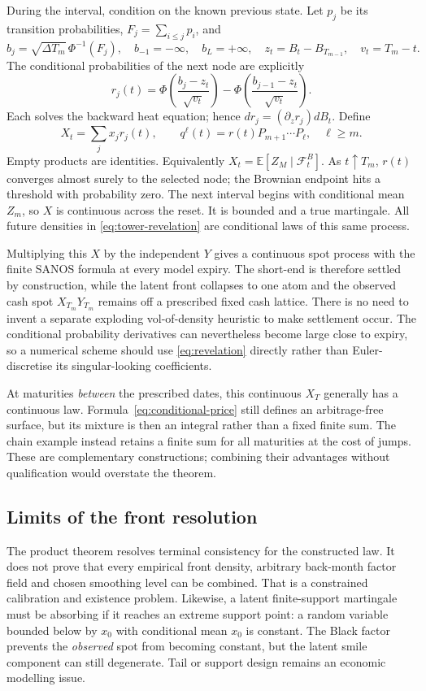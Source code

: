 \documentclass[11pt,a4paper]{article}
\numberwithin{equation}{section}
\theoremstyle{definition}\newtheorem{definition}[theorem]{Definition}
\theoremstyle{remark}\newtheorem{remark}[theorem]{Remark}
\newcommand{\E}{\mathbb E}\newcommand{\R}{\mathbb R}
\newcommand{\F}{\mathcal F}\newcommand{\G}{\mathcal G}
\begin{document}
During the interval, condition on the known previous state. Let $p_j$ be its transition probabilities, $F_j=\sum_{i\leq j}p_i$, and
\[
 b_j=\sqrt{\Delta T_m}\,\Phi^{-1}(F_j),\quad
 b_{-1}=-\infty,\quad b_L=+\infty,\quad
 z_t=B_t-B_{T_{m-1}},\quad v_t=T_m-t.
\]
The conditional probabilities of the next node are explicitly
\begin{equation}
 r_j(t)=\Phi\left(\frac{b_j-z_t}{\sqrt{v_t}}\right)
       -\Phi\left(\frac{b_{j-1}-z_t}{\sqrt{v_t}}\right).
 \label{eq:revelation}
\end{equation}
Each solves the backward heat equation; hence $dr_j=(\partial_z r_j)dB_t$. Define
\begin{equation}
 X_t=\sum_jx_jr_j(t),\qquad
 q^\ell(t)=r(t)P_{m+1}\cdots P_\ell,\quad \ell\geq m.
 \label{eq:tower-revelation}
\end{equation}
Empty products are identities. Equivalently $X_t=\E[Z_M\mid\F_t^B]$. As $t\uparrow T_m$, $r(t)$ converges almost surely to the selected node; the Brownian endpoint hits a threshold with probability zero. The next interval begins with conditional mean $Z_m$, so $X$ is continuous across the reset. It is bounded and a true martingale. All future densities in \eqref{eq:tower-revelation} are conditional laws of this same process.

Multiplying this $X$ by the independent $Y$ gives a continuous spot process with the finite SANOS formula at every model expiry. The short-end is therefore settled by construction, while the latent front collapses to one atom and the observed cash spot $X_{T_m}Y_{T_m}$ remains off a prescribed fixed cash lattice. There is no need to invent a separate exploding vol-of-density heuristic to make settlement occur. The conditional probability derivatives can nevertheless become large close to expiry, so a numerical scheme should use \eqref{eq:revelation} directly rather than Euler-discretise its singular-looking coefficients.

At maturities \emph{between} the prescribed dates, this continuous $X_T$ generally has a continuous law. Formula~\eqref{eq:conditional-price} still defines an arbitrage-free surface, but its mixture is then an integral rather than a fixed finite sum. The chain example instead retains a finite sum for all maturities at the cost of jumps. These are complementary constructions; combining their advantages without qualification would overstate the theorem.

\subsection{Limits of the front resolution}
The product theorem resolves terminal consistency for the constructed law. It does not prove that every empirical front density, arbitrary back-month factor field and chosen smoothing level can be combined. That is a constrained calibration and existence problem. Likewise, a latent finite-support martingale must be absorbing if it reaches an extreme support point: a random variable bounded below by $x_0$ with conditional mean $x_0$ is constant. The Black factor prevents the \emph{observed} spot from becoming constant, but the latent smile component can still degenerate. Tail or support design remains an economic modelling issue.
\end{document}
